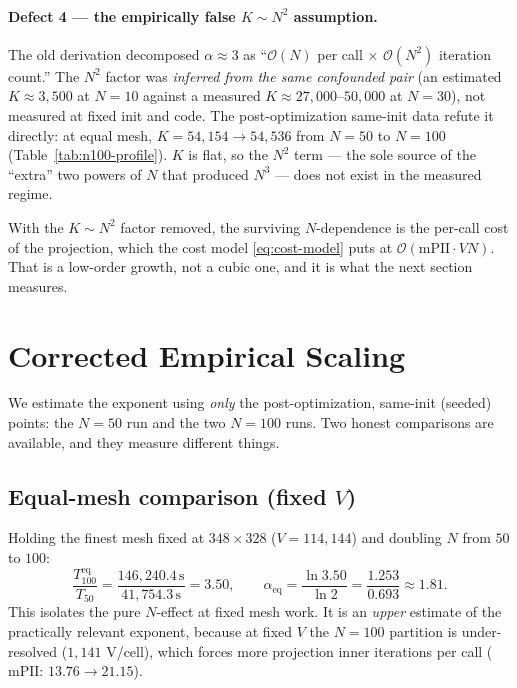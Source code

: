 \documentclass[11pt,a4paper]{article}
\begin{document}
\paragraph{Defect 4 --- the empirically false $K\sim N^2$ assumption.}
The old derivation decomposed $\alpha\approx3$ as ``$\mathcal{O}(N)$ per call
$\times$ $\mathcal{O}(N^2)$ iteration count.''  The $N^2$ factor was
\emph{inferred from the same confounded pair} (an estimated $K\approx3{,}500$ at
$N=10$ against a measured $K\approx27{,}000$--$50{,}000$ at $N=30$), not
measured at fixed init and code.  The post-optimization same-init data refute
it directly: at equal mesh, $K = 54{,}154 \to 54{,}536$ from $N=50$ to $N=100$
(Table~\ref{tab:n100-profile}).  $K$ is flat, so the $N^2$ term --- the sole
source of the ``extra'' two powers of $N$ that produced $N^3$ --- does not
exist in the measured regime.

\medskip
With the $K\sim N^2$ factor removed, the surviving $N$-dependence is the
per-call cost of the projection, which the cost model
\eqref{eq:cost-model} puts at $\mathcal{O}(\mathrm{mPII}\cdot VN)$.  That is a
low-order growth, not a cubic one, and it is what the next section measures.

\section{Corrected Empirical Scaling}
\label{sec:fit}

We estimate the exponent using \emph{only} the post-optimization, same-init
(seeded) points: the $N=50$ run and the two $N=100$ runs.  Two honest
comparisons are available, and they measure different things.

\subsection{Equal-mesh comparison (fixed $V$)}

Holding the finest mesh fixed at $348\times328$ ($V=114{,}144$) and doubling
$N$ from $50$ to $100$:
\begin{equation}
  \frac{T_{100}^{\text{eq}}}{T_{50}}
  = \frac{146{,}240.4\,\text{s}}{41{,}754.3\,\text{s}}
  = 3.50,
  \qquad
  \alpha_{\text{eq}}
  = \frac{\ln 3.50}{\ln 2}
  = \frac{1.253}{0.693}
  \approx \mathbf{1.81}.
  \label{eq:alpha-eq}
\end{equation}
This isolates the pure $N$-effect at fixed mesh work.  It is an \emph{upper}
estimate of the practically relevant exponent, because at fixed $V$ the
$N=100$ partition is under-resolved ($1{,}141$ V/cell), which forces more
projection inner iterations per call ($\mathrm{mPII}$: $13.76\to21.15$).
\end{document}
